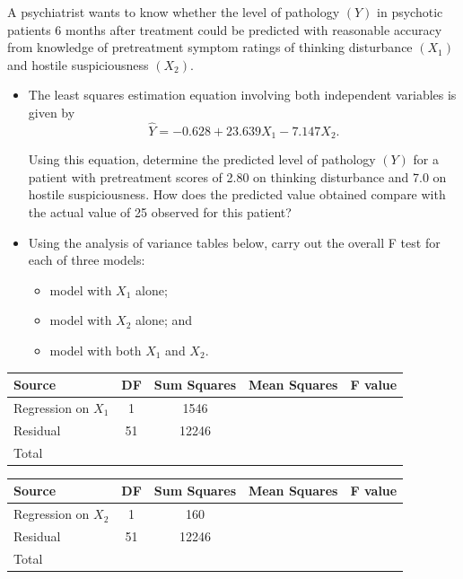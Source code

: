 A psychiatrist wants to know whether the level of pathology $(Y)$ in psychotic patients 6 months after treatment could be predicted with reasonable accuracy from knowledge of pretreatment symptom ratings of thinking disturbance $(X_1)$ and hostile suspiciousness $(X_2)$.

\begin{itemize}
\item[(a)] The least squares estimation equation involving both independent variables is given by
\[
\hat{Y} = -0.628 + 23.639X_1 - 7.147X_2.
\]

Using this equation, determine the predicted level of pathology $(Y)$ for a patient with pretreatment scores of 2.80 on thinking disturbance and 7.0 on hostile suspiciousness. How does the predicted value obtained compare with the actual value of 25 observed for this patient?

\item[(b)] Using the analysis of variance tables below, carry out the overall F test for each of three models:

\begin{itemize}
\item[i)] model with $X_1$ alone;
\item[ii)] model with $X_2$ alone; and
\item[iii)] model with both $X_1$ and $X_2$.
\end{itemize}

\end{itemize}

\begin{center}
\begin{tabular}{|l|c|c|c|c|}
\hline
Source & DF & Sum Squares & Mean Squares & F value \\
\hline
Regression on $X_1$ & 1 & 1546 & & \\
Residual & 51 & 12246 & & \\
Total & & & & \\
\hline
\end{tabular}
\end{center}

\begin{center}
\begin{tabular}{|l|c|c|c|c|}
\hline
Source & DF & Sum Squares & Mean Squares & F value \\
\hline
Regression on $X_2$ & 1 & 160 & & \\
Residual & 51 & 12246 & & \\
Total & & & & \\
\hline
\end{tabular}
\end{center}

